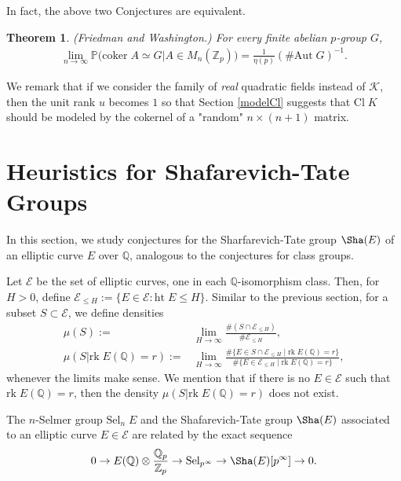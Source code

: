 \documentclass[12pt,reqno]{amsart}
\newtheorem{thm}{Theorem}[section]
\numberwithin{equation}{section}
\def\Z{{\mathbb Z}}
\def\Q{{\mathbb Q}}
\def\P{{\mathbb P}}
\def\sK{{\mathscr K}}
\def\sE{{\mathscr E}}
\begin{document}
In fact, the above two Conjectures are equivalent.

\begin{thm}{\rm (Friedman and Washington.)} For every finite abelian $p$-group $G$,
\begin{align*}
\lim_{n \to \infty} \P\big( \text{coker} \; A \simeq G | A \in M_n(\Z_p)\big) = \frac{1}{\eta(p)} (\# \text{Aut} \; G)^{-1}.
\end{align*}
\end{thm}

We remark that if we consider the family of \textit{real} quadratic fields instead of $\sK$, then the unit rank $u$ becomes $1$ so that Section \ref{modelCl} suggests that $\text{Cl} \; K$ should be modeled by the cokernel of a "random" $n \times (n+1)$ matrix.

\section{Heuristics for Shafarevich-Tate Groups}

In this section, we study conjectures for the Sharfarevich-Tate group $\Sha(E)$ of an elliptic curve $E$ over $\Q$, analogous to the conjectures for class groups.

Let $\sE$ be the set of elliptic curves, one in each $\Q$-isomorphism class. Then, for $H>0$, define $\sE_{\le H}:= \{E \in \sE : \text{ht} \; E \le H \}$. Similar to the previous section, for a subset $S \subset \sE$, we define densities
\begin{align*}
\mu(S):=& \lim_{H \to \infty} \frac{\# (S \cap \sE_{\le H})}{\# \sE_{\le H}},\\
\mu(S | \text{rk} \; E(\Q) = r):=& \lim_{H \to \infty} \frac{\# \{E \in S \cap \sE_{\le H} \;|\; \text{rk} \; E(\Q) = r \}}{\# \{ E \in \sE_{\le H}\;|\;  \text{rk} \; E(\Q) = r\}},
\end{align*}
whenever the limits make sense. We mention that if there is no $E \in \sE$ such that $\text{rk} \; E(\Q) = r$, then the density $\mu(S | \text{rk} \; E(\Q) = r)$ does not exist.

The $n$-Selmer group $\text{Sel}_n \; E$ and the Shafarevich-Tate group $\Sha(E)$ associated to an elliptic curve $E \in \sE$ are related by the exact sequence
\begin{align}\label{exact}
0 \rightarrow E(\Q) \otimes \frac{\Q_p}{\Z_p} \rightarrow \text{Sel}_{p^\infty} \rightarrow \Sha(E)[p^\infty] \rightarrow 0.
\end{align}
\end{document}
